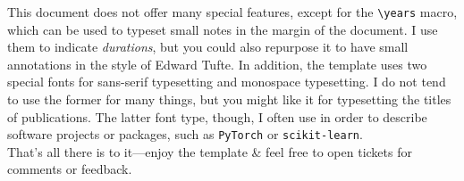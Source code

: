 \documentclass[a4paper,11pt]{article}
\newcommand{\years}[1]{%
  {\reversemarginpar\strut\marginnote{{\small#1}}}%
}
\begin{document}
This document does not offer many special features, except for the
\verb|\years| macro, which can be used to typeset small notes in the
margin of the document. I use them to indicate \emph{durations}, but you
could also repurpose it to have small annotations in the style of Edward
Tufte. In addition, the template uses two special fonts for sans-serif
typesetting and monospace typesetting. I do not tend to use the former
for many things, but you might like it for typesetting the titles of
publications. The latter font type, though, I often use in order to
describe software projects or packages, such as \texttt{PyTorch} or
\texttt{scikit-learn}.\\

That's all there is to it---enjoy the template \& feel free to open
tickets for comments or feedback.
\end{document}

